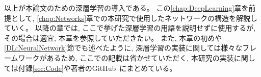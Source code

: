 以上が本論文のための深層学習の導入である。
この\ref{chap:DeepLearning}章を前提として, \ref{chap:Networks}章での本研究で使用したネットワークの構造を解説していく。
以降の章では, ここで挙げた深層学習の用語を説明せずに使用するが, その場合は適宜, 本章を参照していただきたい。
また, 本章の初めや\ref{DL:NeuralNetwork}節でも述べたように, 深層学習の実装に関しては様々なフレームワークがあるため, ここでの記載は省かせていただく, 本研究の実装に関しては付録\ref{sec:Code}や著者のGitHub~\cite{GitHubGotoK}にまとめている。















